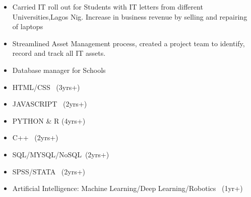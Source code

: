 \documentclass[10pt,a4paper,ragged2e]{altacv}
\begin{document}
\begin{itemize}
\item Carried IT roll out for Students with IT letters from different Universities,Lagos Nig. Increase in business revenue by selling and repairing of laptops
\divider
\item Streamlined Asset Management process, created a project team to identify, record and track all IT assets. 
\divider

\item Database manager for Schools
\end{itemize}
\divider

\begin{itemize}
\item HTML/CSS \ (3yrs+)					
\item JAVASCRIPT \ (2yrs+)
\item PYTHON \& R  (4yrs+)
\item C++ \ (2yrs+)
\item SQL/MYSQL/NoSQL\ (2yrs+)
\item SPSS/STATA \ (2yrs+)
\item Artificial Intelligence: Machine Learning/Deep Learning/Robotics \ (1yr+)
\end{itemize}

%


\end{document}

